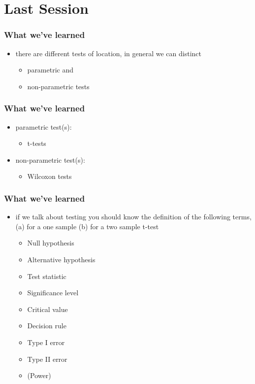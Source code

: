 \documentclass[xcolor={table}]{beamer}
\begin{document}
\section{Last Session}

\begin{frame}\frametitle{What we've learned}
  \begin{itemize}
  \item there are different tests of location, in general we can distinct 
    \begin{itemize}
    \item parametric and
    \item non-parametric tests
    \end{itemize}
  \end{itemize}
\end{frame}

\begin{frame}\frametitle{What we've learned}
  \begin{itemize}
  \item parametric test(s):
    \begin{itemize}
    \item t-tests
    \end{itemize}
  \item non-parametric test(s):
    \begin{itemize}
    \item Wilcoxon tests
    \end{itemize}
  \end{itemize}
\end{frame}

\begin{frame}\frametitle{What we've learned}
  \begin{itemize}
  \item if we talk about testing you should know the definition of the following terms, (a)  for a one sample (b) for a two sample t-test 
    \begin{itemize}
    \item Null hypothesis
    \item Alternative hypothesis
    \item Test statistic
    \item Significance level
    \item Critical value
    \item Decision rule
    \item Type I error
    \item Type II error
    \item (Power)
    \end{itemize}
  \end{itemize}
\end{frame}
\end{document}
